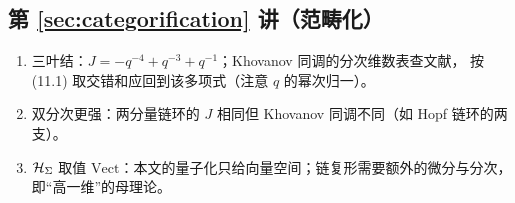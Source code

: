 \subsection*{第 \ref{sec:categorification} 讲（范畴化）}
\begin{enumerate}[leftmargin=*]
  \item 三叶结：$J=-q^{-4}+q^{-3}+q^{-1}$；Khovanov 同调的分次维数表查文献，
        按 (11.1) 取交错和应回到该多项式（注意 $q$ 的幂次归一）。
  \item 双分次更强：两分量链环的 $J$ 相同但 Khovanov 同调不同（如 Hopf 链环的两支）。
  \item $\mathcal{H}_\Sigma$ 取值 $\mathrm{Vect}$：本文的量子化只给向量空间；链复形需要额外的微分与分次，
        即“高一维”的母理论。
\end{enumerate}
